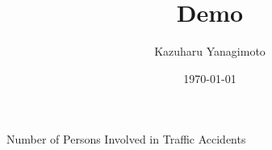 \documentclass[a4paper,12pt]{article}
\newcommand{\rootFolder}{./../..}
\begin{document}
\title{Demo}
\author{Kazuharu Yanagimoto}

\date{\today}
\maketitle

\begin{table}
    \centering
    \caption{Number of Persons Involved in Traffic Accidents}
    
\end{table}
\end{document}
